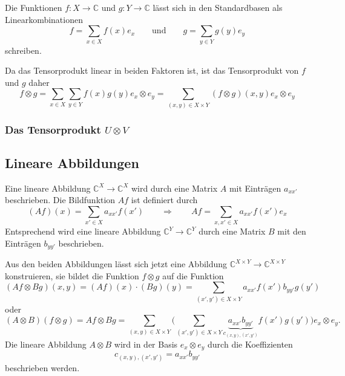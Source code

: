 Die Funktionen $f\colon X\to \mathbb{C}$ und $g\colon Y\to\mathbb{C}$
lässt sich in den Standardbasen als Linearkombinationen
\[
f = \sum_{x\in X} f(x)e_x
\qquad\text{und}\qquad
g = \sum_{y\in Y} g(y)e_y
\]
schreiben.

Da das Tensorprodukt linear in beiden Faktoren ist, ist das Tensorprodukt
von $f$ und $g$ daher
\[
f\otimes g
=
\sum_{x\in X}\sum_{y\in Y}
f(x)g(y) e_x\otimes e_y
=
\sum_{(x,y)\in X\times Y}
(f\otimes g)(x,y) e_x\otimes e_y
\]

%
%
\subsubsection{Das Tensorprodukt $U\otimes V$}


%
%
\subsection{Lineare Abbildungen
\label{buch:diskret:tensor:subsection:linabb}}
Eine lineare Abbildung $\mathbb{C}^X\to \mathbb{C}^X$ wird durch eine
Matrix $A$ mit Einträgen $a_{xx'}$ beschrieben.
Die Bildfunktion $Af$ ist definiert durch
\[
(Af)(x) = \sum_{x'\in X}a_{xx'}f(x')
\qquad\Rightarrow\qquad
Af = \sum_{x,x'\in X} a_{xx'}f(x') e_x
\]
Entsprechend wird eine lineare Abbildung $\mathbb{C}^Y\to\mathbb{C}^Y$
durch eine Matrix $B$ mit den Einträgen $b_{yy'}$ beschrieben.

Aus den beiden Abbildungen lässt sich jetzt eine Abbildung 
$\mathbb{C}^{X\times Y} \to \mathbb{C}^{X\times Y}$
konstruieren, sie bildet die Funktion $f\otimes g$ auf die
Funktion
\[
(Af\otimes Bg)(x,y)
=
(Af)(x)\cdot (Bg)(y)
=
\sum_{(x',y')\in X\times Y}
a_{xx'}f(x') b_{yy'}g(y')
\]
oder
\[
(A\otimes B)
(f\otimes g)
=
Af\otimes Bg
=
\sum_{(x,y)\in X\times Y}
\biggl(
\sum_{(x',y')\in X\times Y}
\underbrace{a_{xx'}b_{yy'}}_{c_{\displaystyle (x,y),(x',y')}}
f(x')g(y')
\biggr)
e_x\otimes e_y.
\]
Die lineare Abbildung $A\otimes B$ wird in der Basis $e_x\otimes e_y$
durch die Koeffizienten
\[
c_{(x,y),(x',y')}
=
a_{xx'}b_{yy'}
\]
beschrieben werden.

%
%
